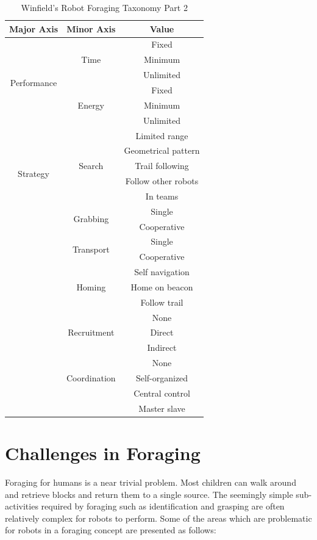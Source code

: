 \begin{table}
\centering
    \caption{Winfield's Robot Foraging Taxonomy Part 2}
    \label{foragingtaxonomytable_part2}
    
\begin{tabular}{ | c | c | c |}
\hline
	Major Axis & Minor Axis & Value  \\ \hline
	\multirow{6}{*}{Performance}
		& \multirow{3}{*}{Time} 
			& Fixed \\  
		& 	& Minimum \\ 
		& 	& Unlimited \\ \cline{2-3}
		& \multirow{3}{*}{Energy} 
			& Fixed \\ 
		& 	& Minimum \\ 
		&	& Unlimited \\ \hline
	\multirow{6}{*}{Strategy}	
		& \multirow{5}{*}{Search} 
			& Limited range \\
		&	& Geometrical pattern\\
		&	& Trail following\\
		&	& Follow other robots\\
		&	& In teams\\ \cline{2-3}
		& \multirow{2}{*}{Grabbing} 
			& Single \\
		&	& Cooperative \\ \cline{2-3}
		& \multirow{2}{*}{Transport} 
			& Single \\
		&	& Cooperative \\ \cline{2-3}
		& \multirow{3}{*}{Homing} 
			& Self navigation \\
		&	& Home on beacon \\
		&	& Follow trail \\\cline{2-3}
		& \multirow{3}{*}{Recruitment} 
			& None \\
		&	& Direct \\
		&	& Indirect \\\cline{2-3}
		& \multirow{3}{*}{Coordination} 
			& None \\
		&	& Self-organized \\
		&	&  Central control \\
		&	& Master slave \\\hline
\end{tabular}
\end{table}


\section{Challenges in Foraging}
\label{challengesinforaging}
Foraging for humans is a near trivial problem. Most children can walk around and retrieve blocks and return them to a single source. The seemingly simple sub-activities required by foraging such as identification and grasping are often relatively complex for robots to perform. Some of the areas which are problematic for robots in a foraging concept are presented as follows:

